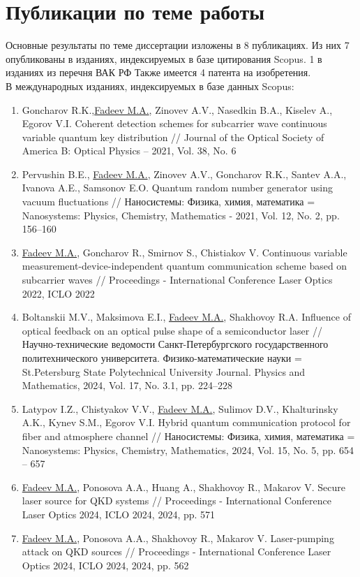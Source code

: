 \section*{Публикации по теме работы}
Основные результаты по теме диссертации изложены в 8 публикациях. Из них 7 опубликованы в изданиях, индексируемых в базе цитирования Scopus. 1 в изданиях из перечня ВАК РФ Также имеется 4 патента на изобретения.\\
В международных изданиях, индексируемых в базе данных Scopus:\\
\begin{enumerate}
    \item Goncharov R.K.,\underline{Fadeev M.A.}, Zinovev A.V., Nasedkin B.A., Kiselev A., Egorov V.I. Coherent detection schemes for subcarrier wave continuous variable quantum key distribution // Journal of the Optical Society of America B: Optical Physics -- 2021, Vol. 38, No. 6
    \item Pervushin B.E., \underline{Fadeev M.A.}, Zinovev A.V., Goncharov R.K., Santev A.A., Ivanova A.E., Samsonov E.O. Quantum random number generator using vacuum fluctuations // Наносистемы: Физика, химия, математика = Nanosystems: Physics, Chemistry, Mathematics - 2021, Vol. 12, No. 2, pp. 156--160
    \item \underline{Fadeev M.A.}, Goncharov R., Smirnov S., Chistiakov V. Continuous variable measurement-device-independent quantum communication scheme based on subcarrier waves // Proceedings - International Conference Laser Optics 2022, ICLO 2022
    \item Boltanskii M.V., Maksimova E.I., \underline{Fadeev M.A.}, Shakhovoy R.A. Influence of optical feedback on an optical pulse shape of a semiconductor laser // Научно-технические ведомости Санкт-Петербургского государственного политехнического университета. Физико-математические науки = St.Petersburg State Polytechnical University Journal. Physics and Mathematics, 2024, Vol. 17, No. 3.1, pp. 224--228
    \item Latypov I.Z., Chistyakov V.V., \underline{Fadeev M.A.}, Sulimov D.V., Khalturinsky A.K., Kynev S.M., Egorov V.I. Hybrid quantum communication protocol for fiber and atmosphere channel // Наносистемы: Физика, химия, математика = Nanosystems: Physics, Chemistry, Mathematics, 2024, Vol. 15, No. 5, pp. 654 -- 657
    \item \underline{Fadeev M.A.}, Ponosova A.A., Huang A., Shakhovoy R., Makarov V. Secure laser source for QKD systems // Proceedings - International Conference Laser Optics 2024, ICLO 2024, 2024, pp. 571
    \item \underline{Fadeev M.A.}, Ponosova A.A., Shakhovoy R., Makarov V. Laser-pumping attack on QKD sources // Proceedings - International Conference Laser Optics 2024, ICLO 2024, 2024, pp. 562
\end{enumerate}

